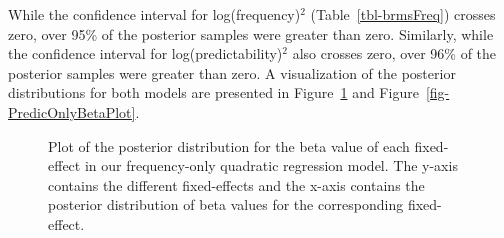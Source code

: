 \documentclass[
  authoryear,
  preprint,
  1p,
  onecolumn]{elsarticle}
\begin{document}
While the confidence interval for log(frequency)\(^2\)
(Table~\ref{tbl-brmsFreq}) crosses zero, over 95\% of the posterior
samples were greater than zero. Similarly, while the confidence interval
for log(predictability)\(^2\) also crosses zero, over 96\% of the
posterior samples were greater than zero. A visualization of the
posterior distributions for both models are presented in
Figure~\ref{fig-FreqOnlyBetaPlot} and
Figure~\ref{fig-PredicOnlyBetaPlot}.

\begin{figure}


\caption{\label{fig-FreqOnlyBetaPlot}Plot of the posterior distribution
for the beta value of each fixed-effect in our frequency-only quadratic
regression model. The y-axis contains the different fixed-effects and
the x-axis contains the posterior distribution of beta values for the
corresponding fixed-effect.}

\end{figure}%
\end{document}
